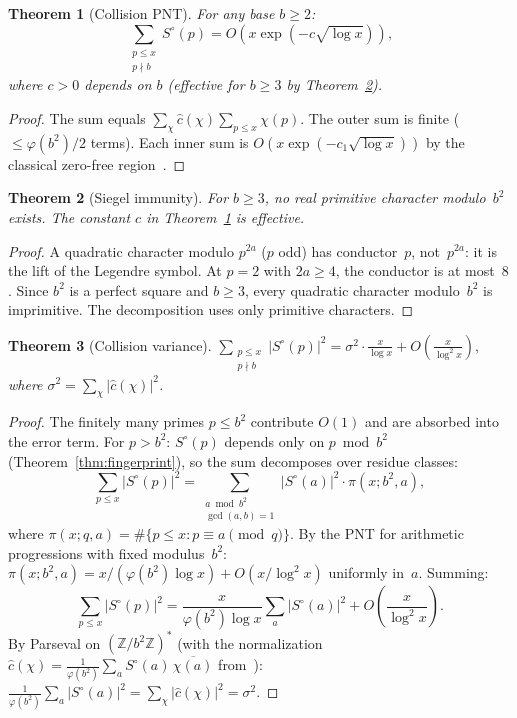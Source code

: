 \documentclass[12pt]{amsart}
\newtheorem{theorem}{Theorem}[section]
\theoremstyle{definition}
\theoremstyle{remark}
\begin{document}
\begin{theorem}[Collision PNT]\label{thm:pnt}
For any base $b \ge 2$:
\[
\sum_{\substack{p \le x \\ p \nmid b}} S^{\circ}(p)
= O\!\left(x \exp\!\left(-c\sqrt{\log x}\right)\right),
\]
where $c > 0$ depends on $b$ (effective for $b \ge 3$
by Theorem~\ref{thm:siegel}).
\end{theorem}

\begin{proof}
The sum equals
$\sum_{\chi} \widehat{c}(\chi) \sum_{p \le x} \chi(p)$.
The outer sum is finite ($\le \varphi(b^2)/2$ terms).
Each inner sum is
$O(x \exp(-c_1\sqrt{\log x}))$ by the classical
zero-free region~\cite{davenport}.
\end{proof}

\begin{theorem}[Siegel immunity]\label{thm:siegel}
For $b \ge 3$, no real primitive character modulo~$b^2$
exists. The constant $c$ in Theorem~\ref{thm:pnt} is
effective.
\end{theorem}

\begin{proof}
A quadratic character modulo $p^{2a}$ ($p$ odd) has
conductor~$p$, not~$p^{2a}$: it is the lift of the
Legendre symbol. At $p = 2$ with $2a \ge 4$, the
conductor is at most~$8$. Since $b^2$ is a perfect
square and $b \ge 3$, every quadratic character
modulo~$b^2$ is imprimitive. The decomposition
uses only primitive characters.
\end{proof}

\begin{theorem}[Collision variance]\label{thm:variance}
$\displaystyle
\sum_{\substack{p \le x \\ p \nmid b}} |S^{\circ}(p)|^2
= \sigma^2 \cdot \frac{x}{\log x}
+ O\!\left(\frac{x}{\log^2 x}\right),
$
where $\sigma^2 = \sum_{\chi} |\widehat{c}(\chi)|^2$.
\end{theorem}

\begin{proof}
The finitely many primes $p \le b^2$ contribute $O(1)$
and are absorbed into the error term. For $p > b^2$:
$S^{\circ}(p)$ depends only on $p \bmod b^2$
(Theorem~\ref{thm:fingerprint}), so the sum decomposes
over residue classes:
\[
\sum_{p \le x} |S^{\circ}(p)|^2 =
\sum_{\substack{a \bmod b^2 \\ \gcd(a,b) = 1}}
|S^{\circ}(a)|^2 \cdot \pi(x; b^2, a),
\]
where $\pi(x; q, a) = \#\{p \le x : p \equiv a \pmod{q}\}$.
By the PNT for arithmetic progressions with fixed
modulus~$b^2$:
$\pi(x; b^2, a) = x / (\varphi(b^2) \log x) +
O(x / \log^2 x)$ uniformly in~$a$. Summing:
\[
\sum_{p \le x} |S^{\circ}(p)|^2 =
\frac{x}{\varphi(b^2) \log x}
\sum_a |S^{\circ}(a)|^2 +
O\!\left(\frac{x}{\log^2 x}\right).
\]
By Parseval on $(\mathbb{Z}/b^2\mathbb{Z})^{*}$ (with
the normalization $\widehat{c}(\chi) =
\frac{1}{\varphi(b^2)} \sum_a S^{\circ}(a)\,
\overline{\chi(a)}$ from~\cite{paperB}):
$\frac{1}{\varphi(b^2)} \sum_a |S^{\circ}(a)|^2 =
\sum_{\chi} |\widehat{c}(\chi)|^2 = \sigma^2$.
\end{proof}
\end{document}
